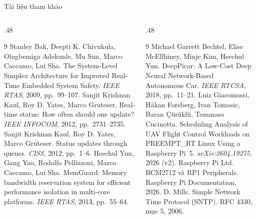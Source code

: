 \documentclass[aspectratio=169,12pt,t]{beamer}
\begin{document}
\begin{frame}{Tài liệu tham khảo}
\vfill
\begin{columns}[T,onlytextwidth]
\begin{column}{.48\textwidth}
\footnotesize
\begin{thebibliography}{9}
\setcounter{enumiv}{0}
\setlength{\itemsep}{.75em}
Stanley Bak, Deepti K. Chivukula, Olugbemiga Adekunle,
      Mu Sun, Marco Caccamo, Lui Sha.
      The System-Level Simplex Architecture for Improved Real-Time Embedded System Safety.
      \emph{IEEE RTAS},
      2009, pp.~99--107.
Sanjit Krishnan Kaul, Roy D. Yates, Marco Gruteser.
      Real-time status: How often should one update?
      \emph{IEEE INFOCOM}, 2012, pp.~2731--2735.
Sanjit Krishnan Kaul, Roy D. Yates, Marco Gruteser.
      Status updates through queues.
      \emph{CISS}, 2012, pp.~1--6.
Heechul Yun, Gang Yao, Rodolfo Pellizzoni, Marco Caccamo, Lui Sha.
      MemGuard: Memory bandwidth reservation system for efficient performance isolation
      in multi-core platforms.
      \emph{IEEE RTAS},
      2013, pp.~55--64.
\end{thebibliography}
\end{column}
\begin{column}{.48\textwidth}
\footnotesize
\begin{thebibliography}{9}
\setcounter{enumiv}{4}
\setlength{\itemsep}{.75em}
Michael Garrett Bechtel, Elise McEllhiney, Minje Kim, Heechul Yun.
      DeepPicar: A Low-Cost Deep Neural Network-Based Autonomous Car.
      \emph{IEEE RTCSA}, 2018, pp.~11--21.
Luiz Giacomossi, Håkan Forsberg, Ivan Tomasic, Baran Çürüklü,
      Tommaso Cucinotta.
      Scheduling Analysis of UAV Flight Control Workloads on PREEMPT\_RT Linux
      Using a Raspberry Pi~5.
      \emph{arXiv:2604.19275}, 2026 (v2).
Raspberry Pi Ltd. BCM2712 và RP1 Peripherals. Raspberry Pi Documentation, 2026.
D. Mills. Simple Network Time Protocol (SNTP). RFC 4330, mục 5, 2006.
\end{thebibliography}
\end{column}
\end{columns}
\vfill
\end{frame}
\begin{frame}[c]
\relax
\normalsize

\end{frame}
\end{document}
